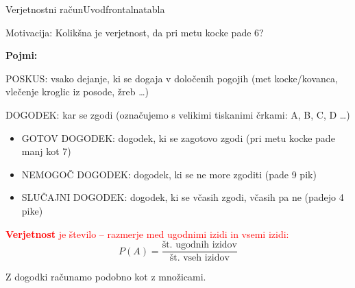\begin{priprava}{}{}{Verjetnostni račun}{Uvod}{frontalna}{tabla}

Motivacija: Kolikšna je verjetnost, da pri metu kocke pade 6?

\textbf{Pojmi:} 

POSKUS: vsako dejanje, ki se dogaja v določenih pogojih (met kocke/kovanca, vlečenje kroglic iz posode, žreb \ldots)

DOGODEK: kar se zgodi (označujemo s velikimi tiskanimi črkami: A, B, C, D \ldots)
\begin{itemize}
    \item GOTOV DOGODEK: dogodek, ki se zagotovo zgodi (pri metu kocke pade manj kot 7)
    \item NEMOGOČ DOGODEK: dogodek, ki se ne more zgoditi (pade 9 pik)
    \item SLUČAJNI DOGODEK: dogodek, ki se včasih zgodi, včasih pa ne (padejo 4 pike)
\end{itemize}

\textcolor{red}{\textbf{Verjetnost} je število -- razmerje med ugodnimi izidi in vsemi izidi:}
$$ P(A) = \frac{\text{št. ugodnih izidov}}{\text{št. vseh izidov}} $$




Z dogodki računamo podobno kot z množicami. 


\end{priprava}
